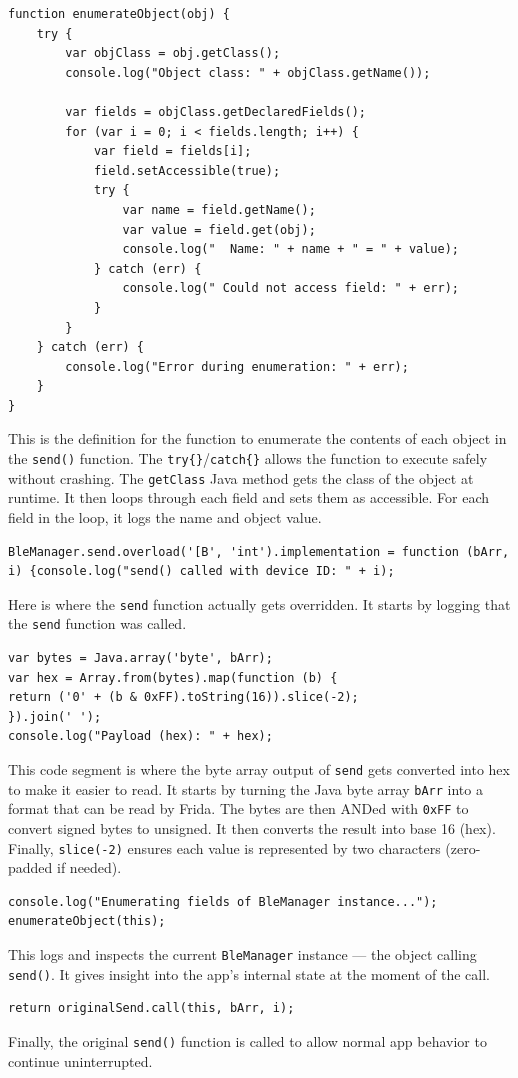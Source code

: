 \begin{verbatim}
function enumerateObject(obj) {
    try {
        var objClass = obj.getClass();
        console.log("Object class: " + objClass.getName());
        
        var fields = objClass.getDeclaredFields();
        for (var i = 0; i < fields.length; i++) {
            var field = fields[i];
            field.setAccessible(true);
            try {
                var name = field.getName();
                var value = field.get(obj);
                console.log("  Name: " + name + " = " + value);
            } catch (err) {
                console.log(" Could not access field: " + err);
            }
        }
    } catch (err) {
        console.log("Error during enumeration: " + err);
    }
}
\end{verbatim}
This is the definition for the function to enumerate the contents of each object in the \texttt{send()} function. The \texttt{try\{\}}/\texttt{catch\{\}} allows the function to execute safely without crashing. The \texttt{getClass} Java method gets the class of the object at runtime. It then loops through each field and sets them as accessible. For each field in the loop, it logs the name and object value.
\begin{verbatim}
BleManager.send.overload('[B', 'int').implementation = function (bArr, i) {console.log("send() called with device ID: " + i);
\end{verbatim}
Here is where the \texttt{send} function actually gets overridden. It starts by logging that the \texttt{send} function was called.
\begin{verbatim}
var bytes = Java.array('byte', bArr);
var hex = Array.from(bytes).map(function (b) {
return ('0' + (b & 0xFF).toString(16)).slice(-2);
}).join(' ');
console.log("Payload (hex): " + hex);
\end{verbatim}
This code segment is where the byte array output of \texttt{send} gets converted into hex to make it easier to read. It starts by turning the Java byte array \texttt{bArr} into a format that can be read by Frida. The bytes are then ANDed with \texttt{0xFF} to convert signed bytes to unsigned. It then converts the result into base 16 (hex). Finally, \texttt{slice(-2)} ensures each value is represented by two characters (zero-padded if needed).
\begin{verbatim}
console.log("Enumerating fields of BleManager instance...");
enumerateObject(this);
\end{verbatim}
This logs and inspects the current \texttt{BleManager} instance — the object calling \texttt{send()}. It gives insight into the app’s internal state at the moment of the call.
\begin{verbatim}
return originalSend.call(this, bArr, i);
\end{verbatim}
Finally, the original \texttt{send()} function is called to allow normal app behavior to continue uninterrupted.

